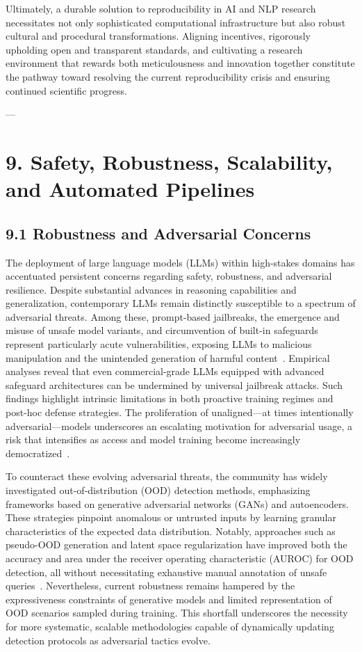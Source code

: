\documentclass[11pt]{article}
\begin{document}
Ultimately, a durable solution to reproducibility in AI and NLP research necessitates not only sophisticated computational infrastructure but also robust cultural and procedural transformations. Aligning incentives, rigorously upholding open and transparent standards, and cultivating a research environment that rewards both meticulousness and innovation together constitute the pathway toward resolving the current reproducibility crisis and ensuring continued scientific progress.

---
\section{9. Safety, Robustness, Scalability, and Automated Pipelines}

\subsection{9.1 Robustness and Adversarial Concerns}

The deployment of large language models (LLMs) within high-stakes domains has accentuated persistent concerns regarding safety, robustness, and adversarial resilience. Despite substantial advances in reasoning capabilities and generalization, contemporary LLMs remain distinctly susceptible to a spectrum of adversarial threats. Among these, prompt-based jailbreaks, the emergence and misuse of unsafe model variants, and circumvention of built-in safeguards represent particularly acute vulnerabilities, exposing LLMs to malicious manipulation and the unintended generation of harmful content~\cite{ref:78,ref:82}. Empirical analyses reveal that even commercial-grade LLMs equipped with advanced safeguard architectures can be undermined by universal jailbreak attacks. Such findings highlight intrinsic limitations in both proactive training regimes and post-hoc defense strategies. The proliferation of unaligned—at times intentionally adversarial—models underscores an escalating motivation for adversarial usage, a risk that intensifies as access and model training become increasingly democratized~\cite{ref:78}.

To counteract these evolving adversarial threats, the community has widely investigated out-of-distribution (OOD) detection methods, emphasizing frameworks based on generative adversarial networks (GANs) and autoencoders. These strategies pinpoint anomalous or untrusted inputs by learning granular characteristics of the expected data distribution. Notably, approaches such as pseudo-OOD generation and latent space regularization have improved both the accuracy and area under the receiver operating characteristic (AUROC) for OOD detection, all without necessitating exhaustive manual annotation of unsafe queries~\cite{ref:82}. Nevertheless, current robustness remains hampered by the expressiveness constraints of generative models and limited representation of OOD scenarios sampled during training. This shortfall underscores the necessity for more systematic, scalable methodologies capable of dynamically updating detection protocols as adversarial tactics evolve.
\end{document}
